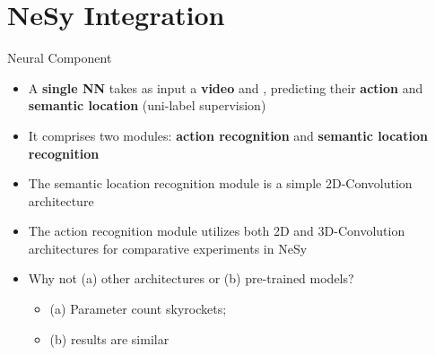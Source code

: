 \documentclass[10pt, aspectratio=169]{beamer}
\begin{document}
\section{NeSy Integration}
{
    \begin{frame}
        \sectionpage%
    \end{frame}
}


\begin{frame}{Neural Component}
    \begin{itemize}
        \setlength{\itemsep}{10pt}
        \item A \textbf{single NN} takes as input a \textbf{video} and  , predicting their \textbf{action} and \textbf{semantic location} (uni-label supervision)
        \item It comprises two modules: \textbf{action recognition} and \textbf{semantic location recognition}
        \item The semantic location recognition module is a simple \textcolor{umBlueLighter}{2D-Convolution} architecture
        \item The action recognition module utilizes both \textcolor{umBlueLighter}{2D} and \textcolor{umBlueLighter}{3D-Convolution} architectures for comparative experiments in NeSy
        \item Why not (a) other architectures or (b) pre-trained models?  
    \vspace{5pt}
    \begin{itemize}
        \setlength{\itemsep}{3pt}
        \item (a) Parameter count skyrockets;
        \item (b) results are similar
    \end{itemize}
    \end{itemize}
\end{frame}
\end{document}
